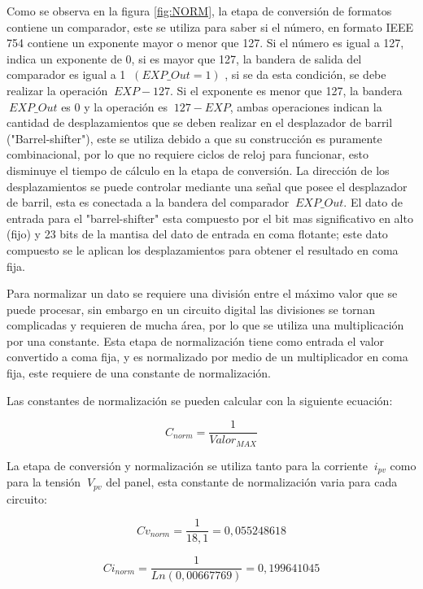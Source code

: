Como se observa en la figura \ref{fig:NORM}, la etapa de conversión de formatos contiene un comparador, este se utiliza para saber si el número, en formato IEEE 754 contiene un exponente mayor o menor que 127. Si el número es igual a 127, indica un exponente de 0, si es mayor que 127, la bandera de salida del comparador es igual a 1 $\ \left(EXP\_Out = 1 \right)$ , si se da esta condición, se debe realizar la operación $\ EXP - 127$. Si el exponente es menor que 127, la bandera $\ EXP\_Out$  es 0 y la operación es $\ 127 - EXP$, ambas operaciones indican la cantidad de desplazamientos que se deben realizar en el desplazador de barril ("Barrel-shifter"), este se utiliza debido a que su construcción es puramente combinacional, por lo que no requiere ciclos de reloj para funcionar, esto disminuye el tiempo de cálculo en la etapa de conversión. 
La dirección de los desplazamientos se puede controlar mediante una señal que posee el desplazador de barril, esta es conectada a la bandera del comparador  $\ EXP\_Out $. El dato de entrada para el "barrel-shifter" esta compuesto por el bit mas significativo en alto (fijo) y 23 bits de la mantisa del dato de entrada en coma flotante; este dato compuesto se le aplican los desplazamientos para obtener el resultado en coma fija.    

Para normalizar un dato se requiere una división entre el máximo valor que se puede procesar, sin embargo en un circuito digital las divisiones se tornan complicadas y requieren de mucha área, por lo que se utiliza una multiplicación por una constante. Esta etapa de normalización tiene como entrada el valor convertido a coma fija, y es normalizado por medio de un multiplicador en coma fija, este requiere de una constante de normalización. 

Las constantes de normalización se pueden calcular con la siguiente ecuación: 
      

\begin{equation} \label{eq:ej1}
  C_{norm}
  = \frac{1}{Valor_{MAX}}  
\end{equation}  

La etapa de conversión y normalización se utiliza tanto para la corriente $\ i_{pv} $ como para la tensión $\ V_{pv} $ del panel, esta constante de normalización varia para cada circuito:
  
\begin{equation} \label{eq:ej2}
  Cv_{norm}
  = \frac{1}{18,1} = 0,055248618  
\end{equation}

\begin{equation} \label{eq:ej3}
  Ci_{norm}
  = \frac{1}{Ln\left(0,00667769\right)} = 0,199641045  
\end{equation}
 
